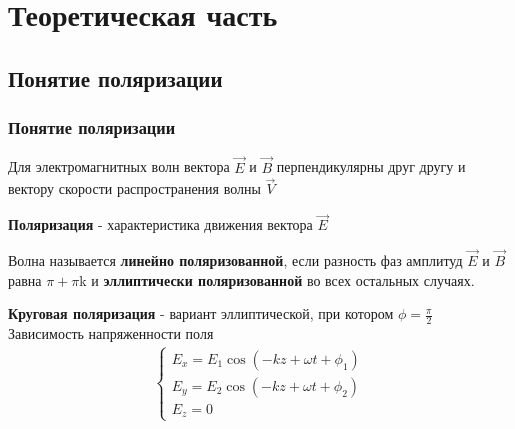 \documentclass[10pt,pdf,hyperref={unicode}, dvipsnames, handout]{beamer}
\begin{document}
\section{Теоретическая часть}
\begin{frame}[t]
	\subsection{Понятие поляризации}
	\frametitle{Понятие поляризации}
	Для электромагнитных волн вектора $\vec{E}$ и $\vec{B}$ перпендикулярны друг другу и вектору скорости распространения волны $\vec{V}$
	
	\textbf{Поляризация} - характеристика движения вектора $\vec{E}$
	
	Волна называется \textbf{линейно поляризованной}, если разность фаз амплитуд $\vec{E}$ и $\vec{B}$ равна $\pi+\pi$k
	и \textbf{эллиптически поляризованной} во всех остальных случаях.
	
	\textbf{Круговая поляризация} - вариант эллиптической, при котором $\phi=\frac{\pi}{2}$
	Зависимость напряженности поля
	\begin{gather}
		\begin{cases} 
			E_x = E_1\cos\left(-kz+\omega t+ \phi_1\right) \\
			E_y = E_2\cos\left(-kz+\omega t+ \phi_2\right) \\
			E_z = 0
		\end{cases}
	\end{gather}
\end{frame}
\end{document}
